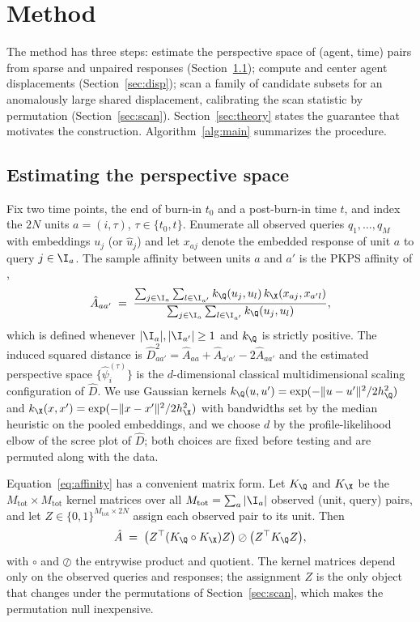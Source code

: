 \section{Method}
\label{sec:method}

The method has three steps: estimate the perspective space of (agent, time) pairs from sparse and unpaired responses (Section~\ref{sec:est-ps}); compute and center agent displacements (Section~\ref{sec:disp}); scan a family of candidate subsets for an anomalously large shared displacement, calibrating the scan statistic by permutation (Section~\ref{sec:scan}). Section~\ref{sec:theory} states the guarantee that motivates the construction. Algorithm~\ref{alg:main} summarizes the procedure.

\subsection{Estimating the perspective space}
\label{sec:est-ps}

Fix two time points, the end of burn-in $t_0$ and a post-burn-in time $t$, and index the $2N$ units $a=(i,\tau)$, $\tau\in\{t_0,t\}$. Enumerate all observed queries $q_1,\dots,q_M$ with embeddings $u_j$ (or $\hat u_j$) and let $x_{aj}$ denote the embedded response of unit $a$ to query $j\in\I_a$. The sample affinity between units $a$ and $a'$ is the PKPS affinity of \citet{pkps2026},
\begin{equation}
\label{eq:affinity}
\hat A_{aa'} \;=\; \frac{\sum_{j\in\I_a}\sum_{l\in\I_{a'}} k_\Q(u_j,u_l)\,k_\X(x_{aj},x_{a'l})}{\sum_{j\in\I_a}\sum_{l\in\I_{a'}} k_\Q(u_j,u_l)} ,
\end{equation}
which is defined whenever $|\I_a|,|\I_{a'}|\ge 1$ and $k_\Q$ is strictly positive. The induced squared distance is $\hat D^2_{aa'} = \hat A_{aa}+\hat A_{a'a'}-2\hat A_{aa'}$ and the estimated perspective space $\{\hat\psi_i^{(\tau)}\}$ is the $d$-dimensional classical multidimensional scaling configuration of $\hat D$. We use Gaussian kernels $k_\Q(u,u') = \exp(-\|u-u'\|^2/2h_\Q^2)$ and $k_\X(x,x') = \exp(-\|x-x'\|^2/2h_\X^2)$ with bandwidths set by the median heuristic on the pooled embeddings, and we choose $d$ by the profile-likelihood elbow of the scree plot of $\hat D$; both choices are fixed before testing and are permuted along with the data.

Equation~\eqref{eq:affinity} has a convenient matrix form. Let $K_\Q$ and $K_\X$ be the $M_{\mathrm{tot}}\times M_{\mathrm{tot}}$ kernel matrices over all $M_{\mathrm{tot}} = \sum_a|\I_a|$ observed (unit, query) pairs, and let $Z\in\{0,1\}^{M_{\mathrm{tot}}\times 2N}$ assign each observed pair to its unit. Then
\begin{equation}
\label{eq:matrix}
\hat A \;=\; \big(Z^\top (K_\Q\circ K_\X) Z\big) \oslash \big(Z^\top K_\Q Z\big),
\end{equation}
with $\circ$ and $\oslash$ the entrywise product and quotient. The kernel matrices depend only on the observed queries and responses; the assignment $Z$ is the only object that changes under the permutations of Section~\ref{sec:scan}, which makes the permutation null inexpensive.

